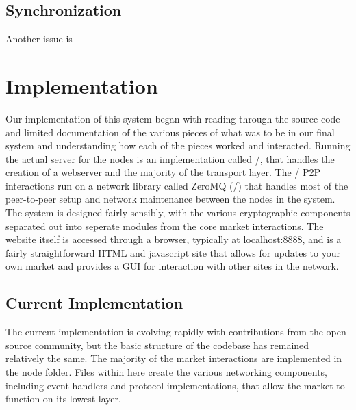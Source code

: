\documentclass[11pt,twocolumn]{article}
\begin{document}
\subsection{Synchronization}

Another issue is 






\section{Implementation}
Our implementation of this system began with reading through the source code and limited documentation of the various pieces of what was to be in our final system and understanding how each of the pieces worked and interacted.
Running the actual server for the nodes is an implementation called \Tornado/, that handles the creation of a webserver and the majority of the transport layer.
The \OpenBazaar/ P2P interactions run on a network library called ZeroMQ (\ZMQ/) that handles most of the peer-to-peer setup and network maintenance between the nodes in the system.
The system is designed fairly sensibly, with the various cryptographic components separated out into seperate modules from the core market interactions.
The website itself is accessed through a browser, typically at {{\sc localhost:8888}}, and is a fairly straightforward HTML and javascript site that allows for updates to your own market and provides a GUI for interaction with other sites in the network.

\subsection{Current Implementation}
The current implementation is evolving rapidly with contributions from the open-source community, but the basic structure of the codebase has remained relatively the same.
The majority of the market interactions are implemented in the node folder.
Files within here create the various networking components, including event handlers and protocol implementations, that allow the market to function on its lowest layer. 
\end{document}

